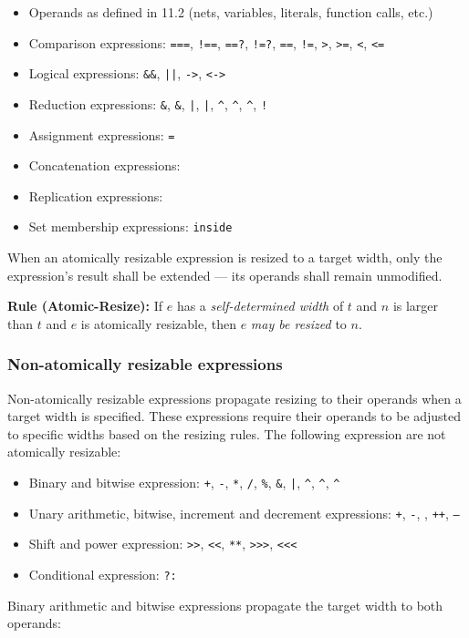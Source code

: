 \documentclass{article}
\newcommand{\tild}{\raisebox{-.7ex}{\textasciitilde{}}}
\newcommand{\sds}{\emph{self-determined width}}
\newcommand{\mbr}{\emph{may be resized}}
\newenvironment{typingrule}[1]%
{\par\noindent\textbf{Rule (#1):} }%
{\par}
\newcommand{\binOp}{\texttt{+}, \texttt{-}, \texttt{*}, \texttt{/}, \texttt{\%},
\texttt{\&}, \texttt{|}, \texttt{\^{}}, \texttt{\^{}\tild},
\texttt{\tild\^{}}}
\newcommand{\unOp}{\texttt{+}, \texttt{-}, \texttt{\tild}, \texttt{++},
  \texttt{--}}
\newcommand{\shiftOp}{\texttt{>>}, \texttt{<}\texttt{<}, \texttt{**},
  \texttt{>>>}, \texttt{<}\texttt{<}\texttt{<}}
\newcommand{\compOp}{\texttt{===}, \texttt{!==}, \texttt{==?}, \texttt{!=?},
  \texttt{==}, \texttt{!=}, \texttt{>}, \texttt{>=}, \texttt{<}, \texttt{<=}}
\newcommand{\logicOp}{\texttt{\&\&}, \texttt{||}, \texttt{->}, \texttt{<->}}
\newcommand{\redOp}{\texttt{\&}, \texttt{\tild\&}, \texttt{|}, \texttt{\tild|},
\texttt{\^{}}, \texttt{\tild\^{}}, \texttt{\^{}\tild}, \texttt{!}}
\begin{document}
\begin{itemize}
  \item Operands as defined in 11.2 (nets, variables, literals, function
    calls, etc.)
  \item Comparison expressions: \compOp{}
  \item Logical expressions: \logicOp{}
  \item Reduction expressions: \redOp{}
  \item Assignment expressions: \texttt{=}
  \item Concatenation expressions: \texttt{\string{\dots\string}}
  \item Replication expressions: \texttt{}
  \item Set membership expressions: \texttt{inside}
\end{itemize}

When an atomically resizable expression is resized to a
target width, only the expression's result shall be extended --- its operands
shall remain unmodified.

\begin{typingrule}{Atomic-Resize}
  If $e$ has a \sds{} of $t$ and $n$ is larger than $t$
  and $e$ is atomically resizable, then $e$ \mbr{} to $n$.
\end{typingrule}

\subsubsection{Non-atomically resizable expressions}%

Non-atomically resizable expressions propagate resizing to their operands when
a target width is specified. These expressions require their operands to be
adjusted to specific widths based on the resizing rules. The following expression
are not atomically resizable:

\begin{itemize}
  \item Binary and bitwise expression: \binOp{}
  \item Unary arithmetic, bitwise, increment and decrement expressions:
    \unOp{}
  \item Shift and power expression: \shiftOp{}
  \item Conditional expression: \texttt{?:}
\end{itemize}

Binary arithmetic and bitwise expressions propagate the target width to both
operands:
\end{document}
